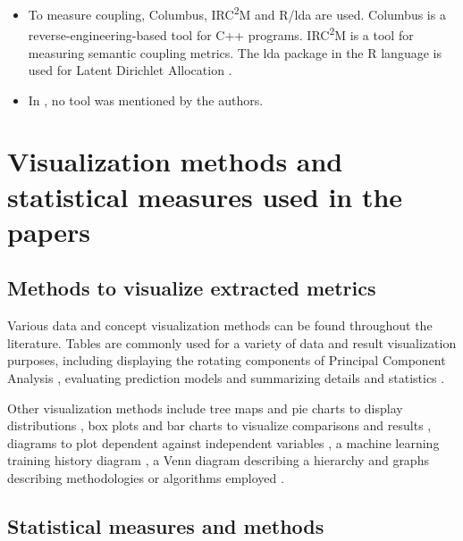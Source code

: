 \begin{itemize}
            \item To measure coupling, Columbus, IRC\textsuperscript{2}M and R/lda are used. Columbus is a reverse-engineering-based tool for C++ programs. IRC\textsuperscript{2}M is a tool for measuring semantic coupling metrics. The lda package in the R language is used for Latent Dirichlet Allocation \cite{s89_coupling}.
            
            \item In \cite{s68_understandability}, no tool was mentioned by the authors.
            
        \end{itemize}
        
        
\section{Visualization methods and statistical measures used in the papers}
\label{visualizzation_statistical_tools}
    
    \subsection{Methods to visualize extracted metrics}
    
        Various data and concept visualization methods can be found throughout the literature. Tables are commonly used for a variety of data and result visualization purposes, including displaying the rotating components of Principal Component Analysis \cite{s23_coupling, s89_coupling}, evaluating prediction models \cite{s68_understandability, s116_maintainability} and summarizing details and statistics \cite{s219_maintainability, s12_cohesion, s118_cohesion, s88_coupling, s13_maintainability, s116_maintainability}. 
        
        Other visualization methods include tree maps and pie charts to display distributions \cite{s219_maintainability, s12_cohesion}, box plots and bar charts to visualize comparisons and results \cite{s88_coupling, s13_maintainability, s29_cohesion}, diagrams to plot dependent against independent variables \cite{s29_cohesion}, a machine learning training history diagram \cite{s13_maintainability}, a Venn diagram describing a hierarchy \cite{s219_maintainability} and graphs describing methodologies or algorithms employed \cite{s12_cohesion, s88_coupling, s29_cohesion}.
        
    \subsection{Statistical measures and methods}
        
